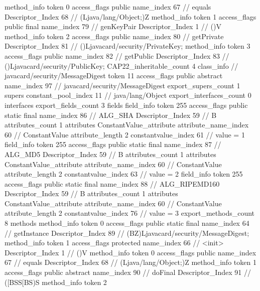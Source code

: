 {{{{{				}
				method_info {
					token	0
					access_flags	public
					name_index	67		// equals
					Descriptor_Index	68		// (Ljava/lang/Object;)Z
				}
				method_info {
					token	1
					access_flags	public final
					name_index	79		// genKeyPair
					Descriptor_Index	1		// ()V
				}
				method_info {
					token	2
					access_flags	public
					name_index	80		// getPrivate
					Descriptor_Index	81		// ()Ljavacard/security/PrivateKey;
				}
				method_info {
					token	3
					access_flags	public
					name_index	82		// getPublic
					Descriptor_Index	83		// ()Ljavacard/security/PublicKey;
				}
			}
			CAP22_inheritable_count	4
		}
		class_info {		// javacard/security/MessageDigest
			token	11
			access_flags	public abstract
			name_index	97		// javacard/security/MessageDigest
			export_supers_count	1
			supers {
				constant_pool_index	11		// java/lang/Object
			}
			export_interfaces_count	0
			interfaces {
			}
			export_fields_count	3
			fields {
			field_info {
				token	255
				access_flags	public static final
				name_index	86		// ALG_SHA
				Descriptor_Index	59		// B
				attributes_count	1
				attributes {
				ConstantValue_attribute {
					attribute_name_index	60		// ConstantValue
					attribute_length	2
					constantvalue_index	61		// value = 1
				}
				}
			}
			field_info {
				token	255
				access_flags	public static final
				name_index	87		// ALG_MD5
				Descriptor_Index	59		// B
				attributes_count	1
				attributes {
				ConstantValue_attribute {
					attribute_name_index	60		// ConstantValue
					attribute_length	2
					constantvalue_index	63		// value = 2
				}
				}
			}
			field_info {
				token	255
				access_flags	public static final
				name_index	88		// ALG_RIPEMD160
				Descriptor_Index	59		// B
				attributes_count	1
				attributes {
				ConstantValue_attribute {
					attribute_name_index	60		// ConstantValue
					attribute_length	2
					constantvalue_index	76		// value = 3
				}
				}
			}
			}
			export_methods_count	8
			methods {
				method_info {
					token	0
					access_flags	public static final
					name_index	64		// getInstance
					Descriptor_Index	89		// (BZ)Ljavacard/security/MessageDigest;
				}
				method_info {
					token	1
					access_flags	protected
					name_index	66		// <init>
					Descriptor_Index	1		// ()V
				}
				method_info {
					token	0
					access_flags	public
					name_index	67		// equals
					Descriptor_Index	68		// (Ljava/lang/Object;)Z
				}
				method_info {
					token	1
					access_flags	public abstract
					name_index	90		// doFinal
					Descriptor_Index	91		// ([BSS[BS)S
				}
				method_info {
					token	2
}}}}}
